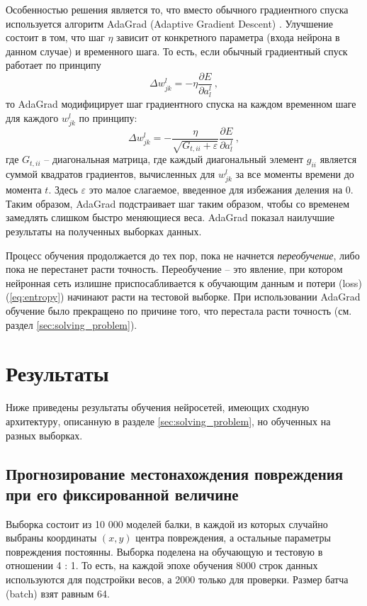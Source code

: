 \documentclass[a4paper,12pt]{article}
\theoremstyle{remark}
\begin{document}
 	Особенностью решения является то, что вместо обычного градиентного спуска используется алгоритм AdaGrad (Adaptive Gradient Descent) \cite{adagrad}. Улучшение состоит в том, что шаг $\eta$ зависит от конкретного параметра (входа нейрона в данном случае) и временного шага. То есть, если обычный градиентный спуск работает по принципу
 	\begin{equation}
 		\Delta w_{jk}^l = - \eta \frac{\partial E}{\partial a_l^l}\ ,
 	\end{equation}
 	то AdaGrad модифицирует шаг градиентного спуска на каждом временном шаге для каждого $w_{jk}^l$ по принципу:
 	\begin{equation}
 		\Delta w_{jk}^l = - \frac{\eta}{\sqrt{G_{t,ii} + \varepsilon}} \frac{\partial E}{\partial a_l^l}\ ,
 	\end{equation}
 	где $G_{t,ii}$ -- диагональная матрица, где каждый диагональный элемент $g_{ii}$ является суммой квадратов градиентов, вычисленных для $w_{jk}^l$ за все моменты времени до момента $t$. Здесь $\varepsilon$ это малое слагаемое, введенное для избежания деления на 0. Таким образом, AdaGrad подстраивает шаг таким образом, чтобы со временем замедлять слишком быстро меняющиеся веса. AdaGrad показал наилучшие результаты на полученных выборках данных.
 	
	Процесс обучения продолжается до тех пор, пока не начнется \textit{переобучение}, либо пока не перестанет расти точность. Переобучение -- это явление, при котором нейронная сеть излишне приспосабливается к обучающим данным и потери (loss) (\ref{eq:entropy}) начинают расти на тестовой выборке. При использовании AdaGrad обучение было прекращено по причине того, что перестала расти точность (см. раздел \ref{sec:solving_problem}).
	
	\newpage
	\section{Результаты}
	
	Ниже приведены результаты обучения нейросетей, имеющих сходную архитектуру, описанную в разделе \ref{sec:solving_problem}, но обученных на разных выборках.
	
	\subsection{Прогнозирование местонахождения повреждения при его фиксированной величине}
	\label{sec:results_location}
	
	Выборка состоит из 10 000 моделей балки, в каждой из которых случайно выбраны координаты $(x, y)$ центра повреждения, а остальные параметры повреждения постоянны. Выборка поделена на обучающую и тестовую в отношении 4 : 1. То есть, на каждой эпохе обучения 8000 строк данных используются для подстройки весов, а 2000 только для проверки. Размер батча (batch) взят равным 64.
	
\end{document}
